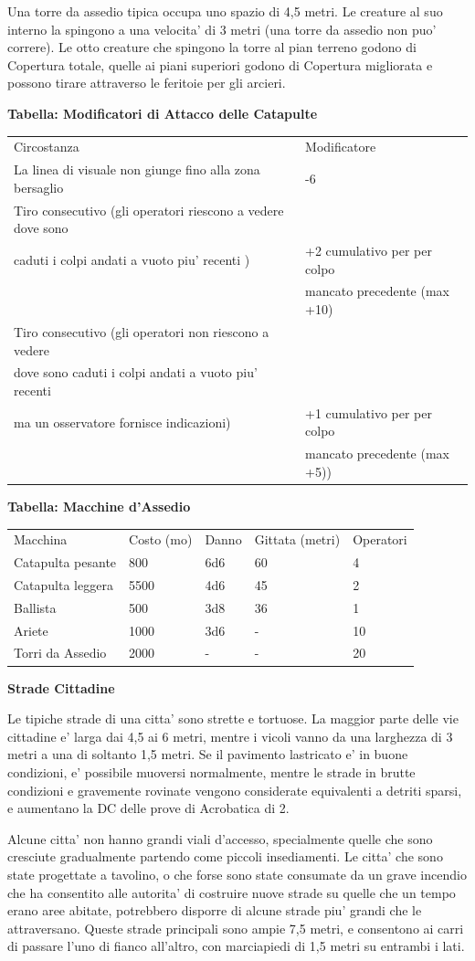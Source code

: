 \documentclass[a4paper,11pt,twoside,openany]{dndbook}
\begin{document}
{Una torre da assedio tipica occupa uno spazio di 4,5 metri. Le creature al suo interno la spingono a una velocita' di 3 metri (una torre da assedio non puo' correre). Le otto creature che spingono la torre al pian terreno godono di Copertura totale, quelle ai piani superiori godono di Copertura migliorata e possono tirare attraverso le feritoie per gli arcieri.

\textbf{Tabella: Modificatori di Attacco delle Catapulte}

\begin{tabular}[c]{@{}ll@{}}
\toprule 
Circostanza & Modificatore\tabularnewline
La linea di visuale non giunge fino alla zona bersaglio & -6\tabularnewline
Tiro consecutivo (gli operatori riescono a vedere dove sono\\
caduti i colpi andati a vuoto piu' recenti ) & +2 cumulativo per per colpo\\
&mancato precedente (max +10)\tabularnewline
Tiro consecutivo (gli operatori non riescono a vedere\\
dove sono caduti i colpi andati a vuoto piu' recenti\\
ma un osservatore fornisce indicazioni) & +1 cumulativo per per colpo\\
&mancato precedente (max +5))\tabularnewline
\bottomrule
\end{tabular}

\textbf{Tabella: Macchine d'Assedio}

\begin{tabular}[c]{@{}lllll@{}}
\toprule 
Macchina & Costo (mo) & Danno & Gittata (metri) & Operatori\tabularnewline
Catapulta pesante & 800 & 6d6 & 60 & 4\tabularnewline
Catapulta leggera & 5500 & 4d6 & 45 & 2\tabularnewline
Ballista & 500 & 3d8 & 36 & 1\tabularnewline
Ariete & 1000 & 3d6 & - & 10\tabularnewline
Torri da Assedio & 2000 & - & - & 20\tabularnewline
\bottomrule
\end{tabular}

\textbf{Strade Cittadine}

Le tipiche strade di una citta' sono strette e tortuose. La maggior parte delle vie cittadine e' larga dai 4,5 ai 6 metri, mentre i vicoli vanno da una larghezza di 3 metri a una di soltanto 1,5 metri. Se il pavimento lastricato e' in buone condizioni, e' possibile muoversi normalmente, mentre le strade in brutte condizioni e gravemente rovinate vengono considerate equivalenti a detriti sparsi, e aumentano la DC delle prove di Acrobatica di 2.

Alcune citta' non hanno grandi viali d'accesso, specialmente quelle che sono cresciute gradualmente partendo come piccoli insediamenti. Le citta' che sono state progettate a tavolino, o che forse sono state consumate da un grave incendio che ha consentito alle autorita' di costruire nuove strade su quelle che un tempo erano aree abitate, potrebbero disporre di alcune strade piu' grandi che le attraversano. Queste strade principali sono ampie 7,5 metri, e consentono ai carri di passare l'uno di fianco all'altro, con marciapiedi di 1,5 metri su entrambi i lati.

}
\end{document}

